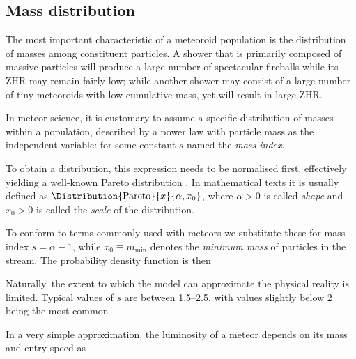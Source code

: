     \subsection{Mass distribution} \label{mas}
        The most important characteristic of a meteoroid population is the distribution of masses
        among constituent particles. A shower that is primarily composed of massive particles
        will produce a large number of spectacular fireballs while its ZHR may remain fairly low;
        while another shower may consist of a large number of tiny meteoroids with low cumulative mass,
        yet will result in large ZHR.

        In meteor science, it is customary to assume a specific distribution of masses within a population,
        described by a power law with particle mass as the independent variable:
        for some constant $s$ named the \emph{mass index}.

        To obtain a distribution, this expression needs to be normalised first,
        effectively yielding a well-known Pareto distribution \citep{arnold1983}.
        In mathematical texts it is usually defined as $\Distribution{\mathrm{Pareto}}{x}{\alpha, x_0}$,
        where $\alpha > 0$ is called \emph{shape} and $x_0 > 0$ is called the \emph{scale} of the distribution.

        To conform to terms commonly used with meteors we substitute these for mass index
        $s = \alpha - 1$, while $x_0 \equiv m_\mathrm{min}$ denotes the \emph{minimum mass} of particles in the stream.
        The probability density function is then 

        Naturally, the extent to which the model can approximate the physical reality is limited.
        Typical values of $s$ are between \numrange{1.5}{2.5}, with values slightly below 2 being the most common \cite{...}

        In a very simple approximation, the luminosity of a meteor depends on its mass and entry speed as

